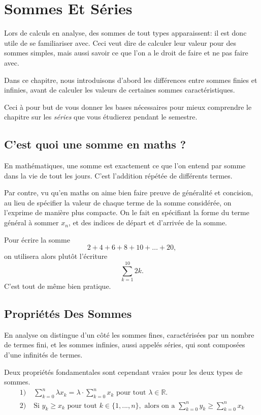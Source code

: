 \documentclass[oneside,11pt,french,table]{book}
\theoremstyle{definition}
\theoremstyle{plain}
\theoremstyle{remark}
\begin{document}
\chapter{Sommes Et Séries}
    Lors de calculs en analyse, des sommes de tout types apparaissent: il est donc utile de se familiariser avec. Ceci veut dire de calculer leur valeur pour des sommes simples, mais aussi savoir ce que l'on a le droit de faire et ne pas faire avec.
    
    Dans ce chapitre, nous introduisons d'abord les différences entre sommes finies et infinies, avant de calculer les valeurs de certaines sommes caractéristiques.
    
    Ceci à pour but de vous donner les bases nécessaires pour mieux comprendre le chapitre sur les \textit{séries} que vous étudierez pendant le semestre.
    \section{C'est quoi une somme en maths ?}
    En mathématiques, une somme est exactement ce que l'on entend par somme dans la vie de tout les jours. C'est l'addition répétée de différents termes.
    
    Par contre, vu qu'en maths on aime bien faire preuve de généralité et concision, au lieu de spécifier la valeur de chaque terme de la somme considérée, on l'exprime de manière plus compacte. On le fait en spécifiant la forme du terme général à sommer $x_n$, et des indices de départ et d'arrivée de la somme.
    
    Pour écrire la somme
    \[
        2+4+6+8+10+\dots+20,
    \]
    on utilisera alors plutôt l'écriture
    \[
        \sum_{k=1}^{10}2k.
    \]
    C'est tout de même bien pratique.
\section{Propriétés Des Sommes}
    En analyse on distingue d'un côté les sommes fines, caractérisées par un nombre de termes fini, et les sommes infinies, aussi appelés séries, qui sont composées d'une infinités de termes.
    
    Deux propriétés fondamentales sont cependant vraies pour les deux types de sommes.
    \begin{align*}
1)& \; \sum_{k=0}^{n}\lambda x_k=\lambda \cdot  \sum_{k=0}^{n}x_k \text{ pour tout } \lambda\in\mathbb{R}. \\
2)& \; \text{Si } y_k \geq x_k \text{ pour tout } k \in \{1,...,n\}, \text{ alors on a } \sum_{k=0}^{n}y_k \geq \sum_{k=0}^{n} x_k
    \end{align*}
\end{document}
